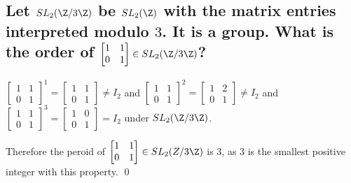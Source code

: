     \subsection[(iii)]{
        Let $SL_2(\Z / 3\Z)$ be $SL_2(\Z)$ with the matrix entries interpreted modulo $3$.
        It is a group.
        What is the order of \(
            \begin{bmatrix}
                1 & 1 \\
                0 & 1 
            \end{bmatrix}
            \in SL_2(\Z/3\Z)
        \)?
    }
        \(
            \begin{bmatrix}
                1 & 1 \\
                0 & 1 
            \end{bmatrix}^1
            =
            \begin{bmatrix}
                1 & 1 \\
                0 & 1 
            \end{bmatrix}
            \neq I_2
        \) and
        \(
            \begin{bmatrix}
                1 & 1 \\
                0 & 1 
            \end{bmatrix}^2
            =
            \begin{bmatrix}
                1 & 2 \\
                0 & 1 
            \end{bmatrix}
            \neq I_2
        \) and
        \(
            \begin{bmatrix}
                1 & 1 \\
                0 & 1 
            \end{bmatrix}^3
            =
            \begin{bmatrix}
                1 & 0 \\
                0 & 1 
            \end{bmatrix}
            = I_2
        \) under $SL_2(\Z/3\Z)$.

        Therefore the peroid of \(
            \begin{bmatrix}
                1 & 1 \\
                0 & 1 
            \end{bmatrix}
            \in SL_2(Z/3\Z)
        \) is $3$,
        as $3$ is the smallest positive integer with this property.
        \qed
        


